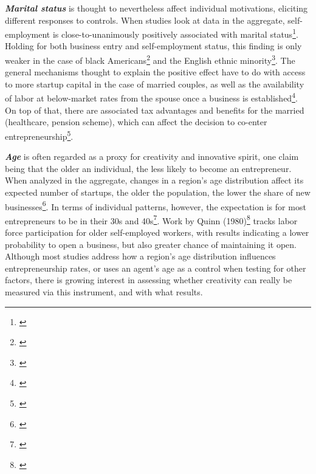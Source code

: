 \textbf{\textit{Marital status}} is thought to nevertheless affect individual motivations, eliciting different responses to controls. When studies look at data in the aggregate, self-employment is close-to-unanimously positively associated with marital status\footnote{\cite[Page~74]{Parker2004}}. Holding for both business entry and self-employment status, this finding is only weaker in the case of black Americans\footnote{\cite{borjas1986self}} and the English ethnic minority\footnote{\cite{clark2000pushed}}. The general mechanisms thought to explain the positive effect have to do with access to more startup capital in the case of married couples, as well as the availability of labor at below-market rates from the spouse once a business is established\footnote{\cite[Page~75]{Parker2004}}. On top of that, there are associated tax advantages and benefits for the married (healthcare, pension scheme), which can affect the decision to co-enter entrepreneurship\footnote{\cite[Page~75]{BlanchflowerOswald1998}}.

\textbf{\textit{Age}} is often regarded as a proxy for creativity and innovative spirit, one claim being that the older an individual, the less likely to become an entrepreneur. When analyzed in the aggregate, changes in a region’s age distribution affect its expected number of startups, the older the population, the lower the share of new businesses\footnote{\cite{Bonte2007}}. In terms of individual patterns, however, the expectation is for most entrepreneurs to be in their 30s and 40s\footnote{\cite{LiangWangLazear2014}}. Work by Quinn (1980)\footnote{\cite{Quinn1980}} tracks labor force participation for older self-employed workers, with results indicating a lower probability to open a business, but also greater chance of maintaining it open. Although most studies address how a region’s age distribution influences entrepreneurship rates, or uses an agent’s age as a control when testing for other factors, there is growing interest in assessing whether creativity can really be measured via this instrument, and with what results.


